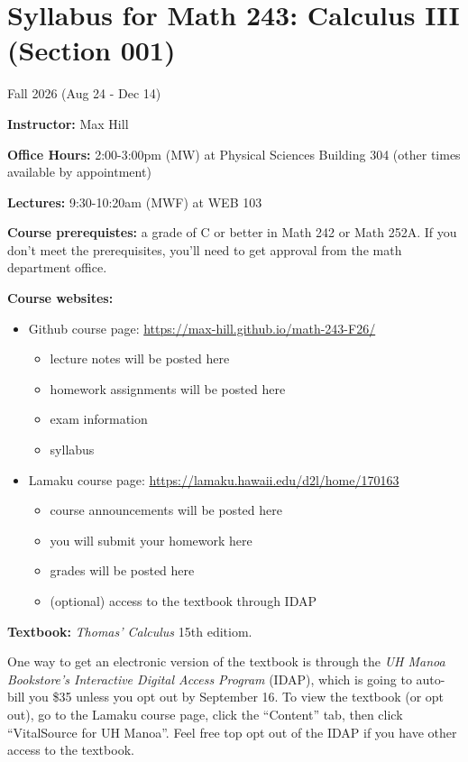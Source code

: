 \documentclass[10pt]{article}
\newcommand{\vt}{\vskip 5mm} %
\newcommand{\Fl}{\vt\noindent\textbf} %
\begin{document}
\section*{Syllabus for Math 243: Calculus III (Section 001)}
Fall 2026 (Aug 24 - Dec 14)


\Fl{Instructor:} Max Hill

\noindent\textbf{Office Hours:} 2:00-3:00pm (MW) at Physical Sciences Building 304 (other
times available by appointment)

\noindent\textbf{Lectures:} 9:30-10:20am (MWF) at WEB 103

\Fl{Course prerequistes:} a grade of C or better in Math 242 or Math 252A. If
you don't meet the prerequisites, you'll need to get approval from the math
department office.

\Fl{Course websites:}

\begin{itemize}
  \item Github course page: \url{https://max-hill.github.io/math-243-F26/}
  \begin{itemize}
    \item lecture notes will be posted here
    \item homework assignments will be posted here
    \item exam information 
    \item syllabus
  \end{itemize}
  \item Lamaku course page: \url{https://lamaku.hawaii.edu/d2l/home/170163}
  \begin{itemize}
    \item course announcements will be posted here
    \item you will submit your homework here
    \item grades will be posted here
    \item (optional) access to the textbook through IDAP
  \end{itemize}
\end{itemize}

\noindent\textbf{Textbook:} \textit{Thomas' Calculus} 15th editiom.

One way to get an electronic version of the textbook is through the \textit{UH
  Manoa Bookstore's Interactive Digital Access Program} (IDAP), which is going
to auto-bill you \$35 unless you opt out by September 16. To view the textbook
(or opt out), go to the Lamaku course page, click the ``Content'' tab, then
click ``VitalSource for UH Manoa''. Feel free top opt out of the IDAP if you
have other access to the textbook.
\end{document}
